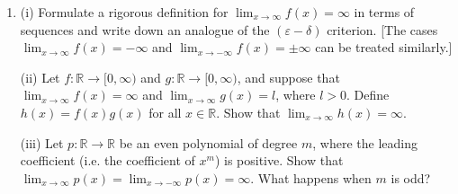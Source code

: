 \documentclass[letterpaper,10pt,english]{jupyterBook}
\begin{document}
\label{\detokenize{Problems:id12}}\begin{enumerate}
%
\setcounter{enumi}{11}
\item {} 
\sphinxAtStartPar
(i) Formulate a rigorous definition for \(\displaystyle\lim_{x \rightarrow \infty}f(x) = \infty\) in terms of sequences  and write down an analogue of the \((\varepsilon-\delta)\) criterion. {[}The cases  \(\displaystyle\lim_{x \rightarrow \infty}f(x) = -\infty\) and \(\displaystyle\lim_{x \rightarrow -\infty}f(x) = \pm \infty\) can be treated similarly.{]}

\sphinxAtStartPar
(ii) Let \(f:\mathbb{R} \rightarrow [0, \infty)\) and \(g:\mathbb{R} \rightarrow [0, \infty)\), and suppose that \(\displaystyle\lim_{x \rightarrow \infty}f(x) = \infty\) and \(\displaystyle\lim_{x \rightarrow \infty}g(x) = l\), where \(l > 0\). Define \(h(x) = f(x)g(x)\) for all \(x \in \mathbb{R}\). Show that \(\displaystyle\lim_{x \rightarrow \infty}h(x) = \infty\).

\sphinxAtStartPar
(iii) Let \(p: \mathbb{R} \rightarrow \mathbb{R}\) be an even polynomial of degree \(m\), where the leading coefficient (i.e. the coefficient of \(x^{m}\)) is positive. Show that \(\displaystyle\lim_{x \rightarrow \infty}p(x) = \lim_{x \rightarrow -\infty}p(x) = \infty\). What happens when \(m\) is odd?

\end{enumerate}
\end{document}
